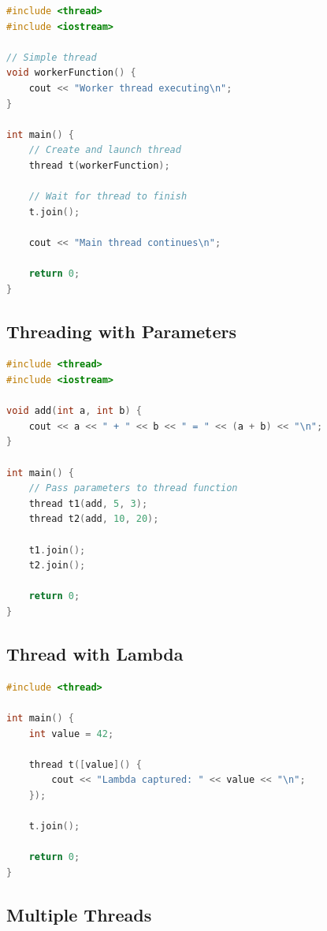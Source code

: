 \begin{lstlisting}[language={C++}]
#include <thread>
#include <iostream>

// Simple thread
void workerFunction() {
    cout << "Worker thread executing\n";
}

int main() {
    // Create and launch thread
    thread t(workerFunction);
    
    // Wait for thread to finish
    t.join();
    
    cout << "Main thread continues\n";
    
    return 0;
}
\end{lstlisting}

\hypertarget{threading-with-parameters}{%
\subsection{Threading with Parameters}\label{threading-with-parameters}}

\begin{lstlisting}[language={C++}]
#include <thread>
#include <iostream>

void add(int a, int b) {
    cout << a << " + " << b << " = " << (a + b) << "\n";
}

int main() {
    // Pass parameters to thread function
    thread t1(add, 5, 3);
    thread t2(add, 10, 20);
    
    t1.join();
    t2.join();
    
    return 0;
}
\end{lstlisting}

\hypertarget{thread-with-lambda}{%
\subsection{Thread with Lambda}\label{thread-with-lambda}}

\begin{lstlisting}[language={C++}]
#include <thread>

int main() {
    int value = 42;
    
    thread t([value]() {
        cout << "Lambda captured: " << value << "\n";
    });
    
    t.join();
    
    return 0;
}
\end{lstlisting}

\hypertarget{multiple-threads}{%
\subsection{Multiple Threads}\label{multiple-threads}}

